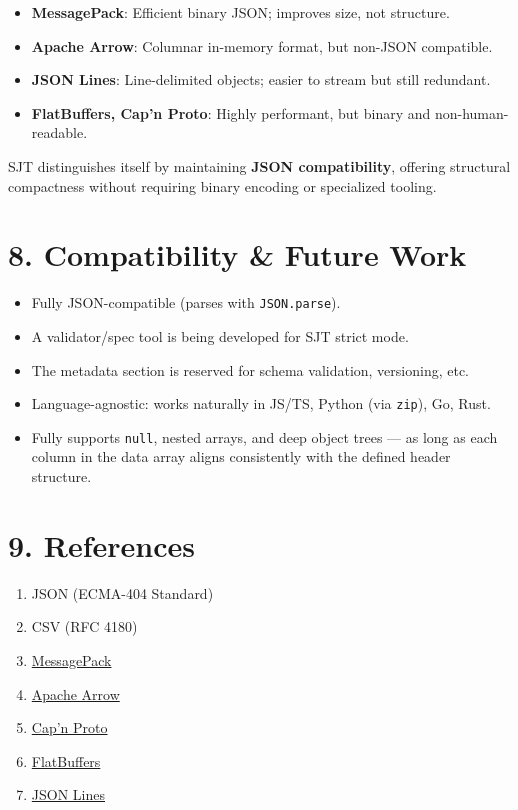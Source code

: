 \documentclass[12pt]{article}
\begin{document}
\begin{itemize}
  \item \textbf{MessagePack}: Efficient binary JSON; improves size, not structure.
  \item \textbf{Apache Arrow}: Columnar in-memory format, but non-JSON compatible.
  \item \textbf{JSON Lines}: Line-delimited objects; easier to stream but still redundant.
  \item \textbf{FlatBuffers, Cap’n Proto}: Highly performant, but binary and non-human-readable.
\end{itemize}

SJT distinguishes itself by maintaining \textbf{JSON compatibility}, offering structural compactness without requiring binary encoding or specialized tooling.

\section*{8. Compatibility \& Future Work}

\begin{itemize}
  \item Fully JSON-compatible (parses with \texttt{JSON.parse}).
  \item A validator/spec tool is being developed for SJT strict mode.
  \item The metadata section is reserved for schema validation, versioning, etc.
  \item Language-agnostic: works naturally in JS/TS, Python (via \texttt{zip}), Go, Rust.
  \item Fully supports \texttt{null}, nested arrays, and deep object trees — as long as each column in the data array aligns consistently with the defined header structure.
\end{itemize}

\section*{9. References}

\begin{enumerate}
  \item JSON (ECMA-404 Standard)
  \item CSV (RFC 4180)
  \item \href{https://msgpack.org/}{MessagePack}
  \item \href{https://arrow.apache.org/}{Apache Arrow}
  \item \href{https://capnproto.org/}{Cap’n Proto}
  \item \href{https://google.github.io/flatbuffers/}{FlatBuffers}
  \item \href{https://jsonlines.org/}{JSON Lines}
\end{enumerate}
\end{document}
